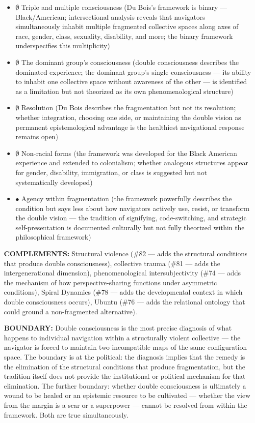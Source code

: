 \begin{itemize}[nosep,leftmargin=*]
  \item $\emptyset$ Triple and multiple consciousness (Du Bois's framework is binary — Black/American; intersectional analysis reveals that navigators simultaneously inhabit multiple fragmented collective spaces along axes of race, gender, class, sexuality, disability, and more; the binary framework underspecifies this multiplicity)
  \item $\emptyset$ The dominant group's consciousness (double consciousness describes the dominated experience; the dominant group's single consciousness — its ability to inhabit one collective space without awareness of the other — is identified as a limitation but not theorized as its own phenomenological structure)
  \item $\emptyset$ Resolution (Du Bois describes the fragmentation but not its resolution; whether integration, choosing one side, or maintaining the double vision as permanent epistemological advantage is the healthiest navigational response remains open)
  \item $\emptyset$ Non-racial forms (the framework was developed for the Black American experience and extended to colonialism; whether analogous structures appear for gender, disability, immigration, or class is suggested but not systematically developed)
  \item $\bullet$ Agency within fragmentation (the framework powerfully describes the condition but says less about how navigators actively use, resist, or transform the double vision — the tradition of signifying, code-switching, and strategic self-presentation is documented culturally but not fully theorized within the philosophical framework)
\end{itemize}


\textbf{COMPLEMENTS:} Structural violence (\#82 — adds the structural conditions that produce double consciousness), collective trauma (\#81 — adds the intergenerational dimension), phenomenological intersubjectivity (\#74 — adds the mechanism of how perspective-sharing functions under asymmetric conditions), Spiral Dynamics (\#78 — adds the developmental context in which double consciousness occurs), Ubuntu (\#76 — adds the relational ontology that could ground a non-fragmented alternative).


\textbf{BOUNDARY:} Double consciousness is the most precise diagnosis of what happens to individual navigation within a structurally violent collective — the navigator is forced to maintain two incompatible maps of the same configuration space. The boundary is at the political: the diagnosis implies that the remedy is the elimination of the structural conditions that produce fragmentation, but the tradition itself does not provide the institutional or political mechanism for that elimination. The further boundary: whether double consciousness is ultimately a wound to be healed or an epistemic resource to be cultivated — whether the view from the margin is a scar or a superpower — cannot be resolved from within the framework. Both are true simultaneously.


